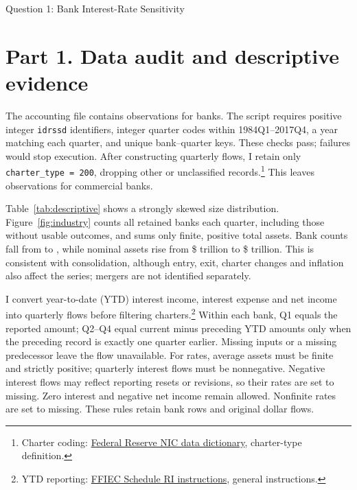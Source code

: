 \documentclass[10pt]{article}
\begin{document}
\begin{center}\Large Question 1: Bank Interest-Rate Sensitivity\end{center}
\vspace{-0.5em}

\section*{Part 1. Data audit and descriptive evidence}
The accounting file contains \RawRows{} observations for \RawBanks{} banks. The script requires positive integer \texttt{idrssd} identifiers, integer quarter codes within 1984Q1--2017Q4, a year matching each quarter, and unique bank--quarter keys. These checks pass; failures would stop execution. After constructing quarterly flows, I retain only \texttt{charter\_type = 200}, dropping \OtherCharters{} other or unclassified records.\footnote{Charter coding: \href{https://www.ffiec.gov/npw/StaticData/DataDownload/NPW\%20Data\%20Dictionary.pdf}{Federal Reserve NIC data dictionary}, charter-type definition.}
This leaves \PanelRows{} observations for \PanelBanks{} commercial banks.

Table~\ref{tab:descriptive} shows a strongly skewed size distribution. Figure~\ref{fig:industry} counts all retained banks each quarter, including those without usable outcomes, and sums only finite, positive total assets. Bank counts fall from \BanksFirst{} to \BanksLast{}, while nominal assets rise from \$\AssetsFirst{} trillion to \$\AssetsLast{} trillion. This is consistent with consolidation, although entry, exit, charter changes and inflation also affect the series; mergers are not identified separately.

I convert year-to-date (YTD) interest income, interest expense and net income into quarterly flows before filtering charters.\footnote{YTD reporting: \href{https://www.fdic.gov/system/files/2024-08/2008-06-ri.pdf}{FFIEC Schedule RI instructions}, general instructions.} Within each bank, Q1 equals the reported amount; Q2--Q4 equal current minus preceding YTD amounts only when the preceding record is exactly one quarter earlier. Missing inputs or a missing predecessor leave the flow unavailable. For rates, average assets must be finite and strictly positive; quarterly interest flows must be nonnegative. Negative interest flows may reflect reporting resets or revisions, so their rates are set to missing. Zero interest and negative net income remain allowed. Nonfinite rates are set to missing. These rules retain bank rows and original dollar flows.
\end{document}
